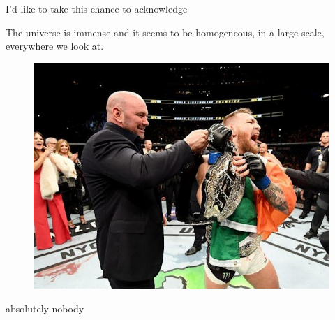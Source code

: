 I'd like to take this chance to acknowledge


\graphicspath{ {./images/} }

The universe is immense and it seems to be homogeneous, 
in a large scale, everywhere we look at.



\begin{figure}[hbt]
	\centering
	\includegraphics{templates/me.jpg}
\end{figure}


absolutely nobody


\fi
